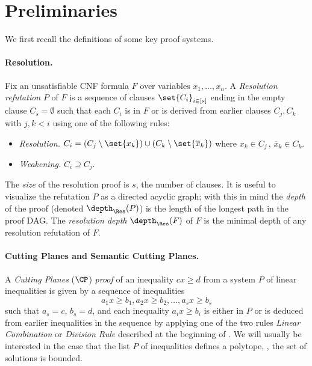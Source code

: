 \documentclass{toc}
\begin{document}
\section{Preliminaries} 
\label{sec:prelims}
%


We first recall the definitions of some key proof systems.

\paragraph{Resolution.} Fix an unsatisfiable CNF formula $F$ over variables $x_1, \ldots, x_n$. 
A \emph{Resolution refutation} $P$ of $F$ is a sequence of clauses $\set{C_i}_{i \in [s]}$ ending in the empty clause $C_s = \emptyset$ such that each $C_i$ is in $F$ or is derived from earlier clauses $C_j, C_k$ with $j, k < i$ using one of the following rules:
\begin{itemize}
	\item \emph{Resolution.} $C_i = (C_j \setminus \set{x_k}) \cup (C_k \setminus \set{\overline x_k})$ where $x_k \in C_j\,$, $\overline x_k \in C_k$.
	\item \emph{Weakening.} $C_i \supseteq C_j$.
\end{itemize}
The \emph{size} of the resolution proof is $s$, the number of clauses.
It is useful to visualize the refutation $P$ as a directed acyclic graph; with this in mind the \emph{depth} of the proof (denoted $\depth_{\Res}(P)$) is the length of the longest path in the proof DAG.
The \emph{resolution depth} $\depth_{\Res}(F)$ of $F$ is the minimal depth of any resolution refutation of $F$.

\paragraph{Cutting Planes and Semantic Cutting Planes.} A \emph{Cutting Planes} ($\CP$)
\emph{proof} of an inequality $cx \geq d$ from a
%
system $P$ of linear inequalities %
is given by a sequence of inequalities \[ a_1x \geq b_1, a_2x \geq b_2, \ldots, a_s x \geq b_s \]
such that $a_s = c$, $b_s = d$, and each inequality $a_ix \geq b_i$ is either in $P$ or is deduced from earlier inequalities in the sequence by applying one of the two rules \emph{Linear Combination} or \emph{Division Rule} described at the beginning of .
We will usually be interested in the case that the
%
list $P$ of inequalities   %
defines a polytope, %
%
\ie, the set of solutions is bounded.  %
%
%
%
\end{document}
